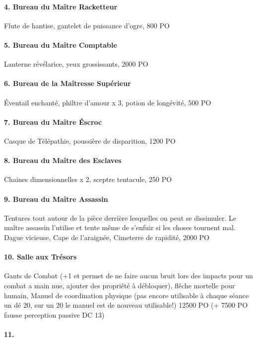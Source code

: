 \paragraph{4. Bureau du Maître Racketteur}
Flute de hantise, gantelet de puissance d'ogre, 800 PO

\paragraph{5. Bureau du Maître Comptable}
Lanterne révélarice, yeux grossissants, 2000 PO

\paragraph{6. Bureau de la Maîtresse Supérieur}
Éventail enchanté, philtre d'amour x 3, potion de longévité, 500 PO

\paragraph{7. Bureau du Maître Éscroc}
Casque de Télépathie, poussière de disparition, 1200 PO

\paragraph{8. Bureau du Maître des Esclaves}
Chaines dimensionnelles x 2, sceptre tentacule, 250 PO

\paragraph{9. Bureau du Maître Assassin}
Tentures tout autour de la pièce derrière lesquelles on peut se dissimuler. 
Le maître assassin l'utilise et tente même de s'enfuir si les choses tournent 
mal.
Dague vicieuse, Cape de l'araignée, Cimeterre de rapidité, 2000 PO

\paragraph{10. Salle aux Trésors}
Gants de Combat (+1 et permet de ne faire aucun bruit lors des impacts pour
un combat a main nue, ajouter des propriété à débloquer), flêche mortelle 
pour humain, Manuel de coordination physique (pas encore utilisable à chaque 
séance un dé 20, sur un 20 le manuel est de nouveau utilisable!)
12500 PO (+ 7500 PO fausse perception passive DC 13)

\paragraph{11. }

